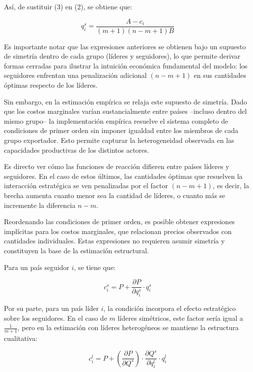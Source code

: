 Así, de sustituir (3) en (2), se obtiene que:

\begin{equation}
    q^{s}_{i} = \frac{A-c_{i}}{(m+1)(n-m+1)B}
\end{equation}

Es importante notar que las expresiones anteriores se obtienen bajo un supuesto de simetría dentro de cada grupo (líderes y seguidores), lo que permite derivar formas cerradas para ilustrar la intuición económica fundamental del modelo: los seguidores enfrentan una penalización adicional $(n-m+1)$ en sus cantidades óptimas respecto de los líderes.

Sin embargo, en la estimación empírica se relaja este supuesto de simetría. Dado que los costos marginales varían sustancialmente entre países --incluso dentro del mismo grupo-- la implementación empírica resuelve el sistema completo de condiciones de primer orden sin imponer igualdad entre los miembros de cada grupo exportador. Esto permite capturar la heterogeneidad observada en las capacidades productivas de los distintos actores.

Es directo ver cómo las funciones de reacción difieren entre países líderes y seguidores. En el caso de estos últimos, las cantidades óptimas que resuelven la interacción estratégica se ven penalizadas por el factor $(n-m+1)$, es decir, la brecha aumenta cuanto menor sea la cantidad de líderes, o cuanto más se incremente la diferencia $n-m$. 

Reordenando las condiciones de primer orden, es posible obtener expresiones implícitas para los costos marginales, que relacionan precios observados con cantidades individuales. Estas expresiones no requieren asumir simetría y constituyen la base de la estimación estructural.

Para un país seguidor $i$, se tiene que:

\begin{equation}
    \label{eq:c_seguidor}
    c_{i}^{s} = P + \frac{\partial P}{\partial q_{i}^{s}}\cdot q_{i}^{s}
\end{equation}

Por su parte, para un país líder $i$, la condición incorpora el efecto estratégico sobre los seguidores. En el caso de $m$ líderes simétricos, este factor sería igual a $\frac{1}{m+1}$, pero en la estimación con líderes heterogéneos se mantiene la estructura cualitativa:

\begin{equation}
    \label{eq:c_lider}
    c_{i}^{l} = P + \left( \frac{\partial P}{\partial Q^{s}}\right) \cdot \frac{\partial Q^{s}}{\partial q_{i}^{l}}\cdot q_{i}^{l}
\end{equation}

